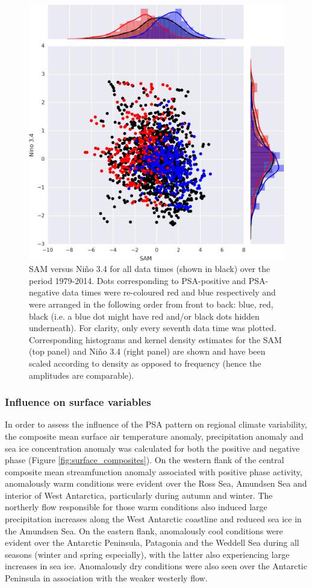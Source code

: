 \begin{figure}
\begin{center}
\includegraphics[width=0.7\columnwidth]{figures/psa/nino34-vs-sam_psa-phases_ERAInterim_surface_030day-runmean_native.png}
\caption[SAM versus Ni\~{n}o 3.4 for various temporal subsets (all data times, PSA-positive, PSA-negative)]{\label{fig:sam_v_enso}
SAM versus Ni\~{n}o 3.4 for all data times (shown in black) over the period 1979-2014. Dots corresponding to PSA-positive and PSA-negative data times were re-coloured red and blue respectively and were arranged in the following order from front to back: blue, red, black (i.e. a blue dot might have red and/or black dots hidden underneath). For clarity, only every seventh data time was plotted. Corresponding histograms and kernel density estimates for the SAM (top panel) and Ni\~{n}o 3.4 (right panel) are shown and have been scaled according to density as opposed to frequency (hence the amplitudes are comparable).%
}
\end{center}
\end{figure}

\subsubsection{Influence on surface variables} 

In order to assess the influence of the PSA pattern on regional climate variability, the composite mean surface air temperature anomaly, precipitation anomaly and sea ice concentration anomaly was calculated for both the positive and negative phase (Figure \ref{fig:surface_composites}). On the western flank of the central composite mean streamfunction anomaly associated with positive phase activity, anomalously warm conditions were evident over the Ross Sea, Amundsen Sea and interior of West Antarctica, particularly during autumn and winter. The northerly flow responsible for those warm conditions also induced large precipitation increases along the West Antarctic coastline and reduced sea ice in the Amundsen Sea. On the eastern flank, anomalously cool conditions were evident over the Antarctic Peninsula, Patagonia and the Weddell Sea during all seasons (winter and spring especially), with the latter also experiencing large increases in sea ice. Anomalously dry conditions were also seen over the Antarctic Peninsula in association with the weaker westerly flow. 

